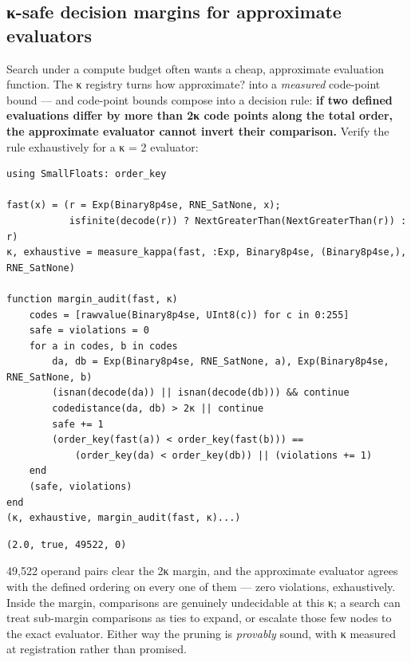 \subsection{κ-safe decision margins for approximate evaluators}



\label{7954056064411327915}{}


Search under a compute budget often wants a cheap, approximate evaluation function. The κ registry turns {\textquotedbl}how approximate?{\textquotedbl} into a \emph{measured} code-point bound — and code-point bounds compose into a decision rule: \textbf{if two defined evaluations differ by more than 2κ code points along the total order, the approximate evaluator cannot invert their comparison.} Verify the rule exhaustively for a κ = 2 evaluator:




\begin{verbatim}
using SmallFloats: order_key

fast(x) = (r = Exp(Binary8p4se, RNE_SatNone, x);
           isfinite(decode(r)) ? NextGreaterThan(NextGreaterThan(r)) : r)
κ, exhaustive = measure_kappa(fast, :Exp, Binary8p4se, (Binary8p4se,), RNE_SatNone)

function margin_audit(fast, κ)
    codes = [rawvalue(Binary8p4se, UInt8(c)) for c in 0:255]
    safe = violations = 0
    for a in codes, b in codes
        da, db = Exp(Binary8p4se, RNE_SatNone, a), Exp(Binary8p4se, RNE_SatNone, b)
        (isnan(decode(da)) || isnan(decode(db))) && continue
        codedistance(da, db) > 2κ || continue
        safe += 1
        (order_key(fast(a)) < order_key(fast(b))) ==
            (order_key(da) < order_key(db)) || (violations += 1)
    end
    (safe, violations)
end
(κ, exhaustive, margin_audit(fast, κ)...)
\end{verbatim}




\begin{verbatim}
(2.0, true, 49522, 0)
\end{verbatim}



49,522 operand pairs clear the 2κ margin, and the approximate evaluator agrees with the defined ordering on every one of them — zero violations, exhaustively. Inside the margin, comparisons are genuinely undecidable at this κ; a search can treat sub-margin comparisons as ties to expand, or escalate those few nodes to the exact evaluator. Either way the pruning is \emph{provably} sound, with κ measured at registration rather than promised.



